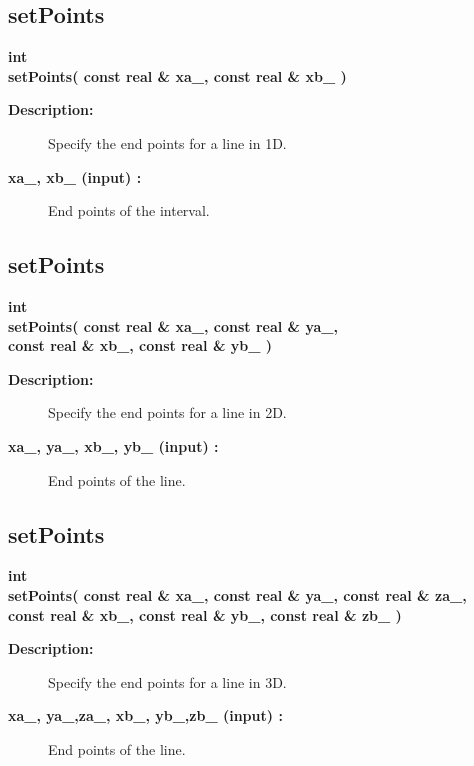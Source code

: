 \subsection{setPoints}
 
\begin{flushleft} \textbf{%
int  \\ 
\settowidth{\LineMappingIncludeArgIndent}{setPoints(}%
setPoints( const real \& xa\_, const real \& xb\_ )
}\end{flushleft}
\begin{description}
\item[{\bf Description:}]  Specify the end points for a line in 1D.
\item[{\bf xa\_, xb\_ (input) :}]  End points of the interval.
\end{description}
\subsection{setPoints}
 
\begin{flushleft} \textbf{%
int   \\ 
\settowidth{\LineMappingIncludeArgIndent}{setPoints(}%
setPoints( const real \& xa\_, const real \& ya\_,\\ 
\hspace{\LineMappingIncludeArgIndent}const real \& xb\_, const real \& yb\_ )
}\end{flushleft}
\begin{description}
\item[{\bf Description:}]  Specify the end points for a line in 2D.
\item[{\bf xa\_, ya\_, xb\_, yb\_ (input) :}]  End points of the line.
\end{description}
\subsection{setPoints}
 
\begin{flushleft} \textbf{%
int   \\ 
\settowidth{\LineMappingIncludeArgIndent}{setPoints(}%
setPoints( const real \& xa\_, const real \& ya\_, const real \& za\_, \\ 
\hspace{\LineMappingIncludeArgIndent}const real \& xb\_, const real \& yb\_, const real \& zb\_ )
}\end{flushleft}
\begin{description}
\item[{\bf Description:}]  Specify the end points for a line in 3D.
\item[{\bf xa\_, ya\_,za\_,  xb\_, yb\_,zb\_ (input) :}]  End points of the line.
\end{description}

